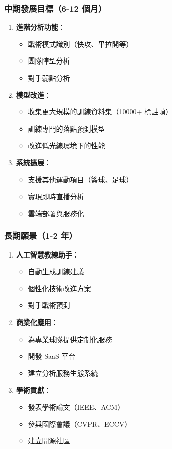 \documentclass[a4paper,14pt,oneside]{article}
\begin{document}
\subsubsection{中期發展目標（6-12 個月）}
\begin{enumerate}
    \item \textbf{進階分析功能}：
    \begin{itemize}
        \item 戰術模式識別（快攻、平拉開等）
        \item 團隊陣型分析
        \item 對手弱點分析
    \end{itemize}
    
    \item \textbf{模型改進}：
    \begin{itemize}
        \item 收集更大規模的訓練資料集（10000+ 標註幀）
        \item 訓練專門的落點預測模型
        \item 改進低光線環境下的性能
    \end{itemize}
    
    \item \textbf{系統擴展}：
    \begin{itemize}
        \item 支援其他運動項目（籃球、足球）
        \item 實現即時直播分析
        \item 雲端部署與服務化
    \end{itemize}
\end{enumerate}

\subsubsection{長期願景（1-2 年）}
\begin{enumerate}
    \item \textbf{人工智慧教練助手}：
    \begin{itemize}
        \item 自動生成訓練建議
        \item 個性化技術改進方案
        \item 對手戰術預測
    \end{itemize}
    
    \item \textbf{商業化應用}：
    \begin{itemize}
        \item 為專業球隊提供定制化服務
        \item 開發 SaaS 平台
        \item 建立分析服務生態系統
    \end{itemize}
    
    \item \textbf{學術貢獻}：
    \begin{itemize}
        \item 發表學術論文（IEEE、ACM）
        \item 參與國際會議（CVPR、ECCV）
        \item 建立開源社區
    \end{itemize}
\end{enumerate}
\end{document}
